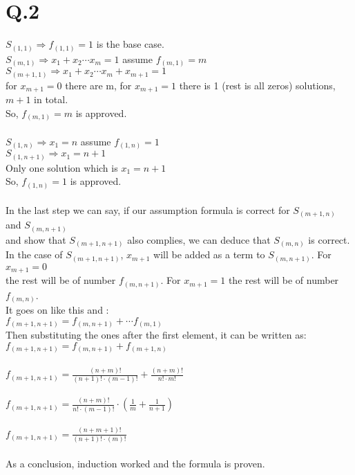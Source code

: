 \documentclass[11pt]{article}
\begin{document}
\section*{Q.2}
	$ S_{(1,1)} \Rightarrow f_{(1,1)} = 1 $ is the base case. \\
	$ S_{(m,1)}  \Rightarrow x_1 + x_2 \cdots x_m = 1 $   assume  $ f_{(m,1)} = m $ \\
	$ S_{(m+1,1)} \Rightarrow x_1 + x_2 \cdots x_m + x_{m+1} = 1 $ \\
	for  $ x_{m+1} = 0 $ there are m, for $ x_{m+1} = 1 $ there is 1 (rest is all zeros) solutions, $m + 1$ in total.\\
	So, $ f_{(m,1)} = m $  is approved. \\
	\\
	$ S_{(1,n)} \Rightarrow x_1 = n $ assume $ f_{(1,n)}  = 1 $ \\
	$ S_{(1,n+1)} \Rightarrow x_1 = n + 1  $ \\
	Only one solution which is $ x_1 = n + 1 $ \\
	So, $ f_{(1,n)}  = 1 $ is approved. \\
	\\
	In the last step we can say, if our assumption formula is correct for $ S_{(m+1,n)} $ and $ S_{(m,n+1)} $ \\
	and show that $S_{(m+1,n+1)}$ also complies, we can deduce that $S_{(m,n)}$ is correct. \\
	In the case of $ S_{(m+1,n+1)} $, $x_{m+1}$ will be added as a term to $ S_{(m,n+1)} $. For $x_{m+1} = 0$ \\
	the rest will be of number $ f_{(m,n+1)} $. For $x_{m+1} = 1$ the rest will be of number $ f_{(m,n)} $. \\
	It goes on like this and : \\
	$ f_{(m+1,n+1)} = f_{(m,n+1)} + \cdots f_{(m,1)}$ \\
	Then substituting the ones after the first element, it can be written as: \\
	$ f_ {(m+1,n+1)} = f_{(m,n+1)} + f_{(m+1,n)} $ \\
	\\
	$ f_ {(m+1,n+1)} = \frac{(n+m)!}{(n+1)! \cdot (m-1)!} + \frac{(n+m)!}{n! \cdot m!} $ \\
	\\
	$ f_ {(m+1,n+1)} = \frac{(n+m)!}{n! \cdot (m-1)!} \cdot ( \frac{1}{m} + \frac{1}{n+1})$ \\
	\\
	$ f_ {(m+1,n+1)} = \frac{(n+m+1)!}{(n+1)! \cdot (m)!} $ \\
	\\
	As a conclusion, induction worked and the formula is proven. \\
\end{document}
